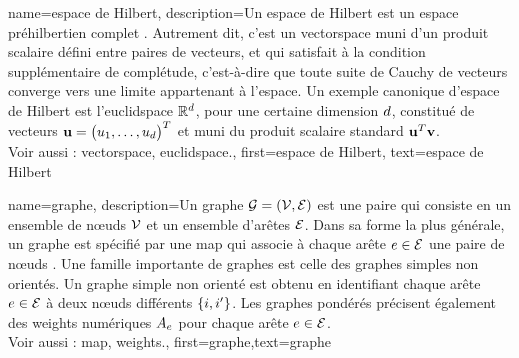 {name={espace de Hilbert},
	description={Un espace de Hilbert est un espace préhilbertien complet \cite{introhilbertbook}. 
		Autrement dit, c’est un \gls{vectorspace} muni d’un produit scalaire défini entre paires de vecteurs, 
		et qui satisfait à la condition supplémentaire de complétude, c’est-à-dire que toute suite de Cauchy de vecteurs 
		converge vers une limite appartenant à l’espace. Un exemple canonique d’espace de Hilbert est l’\gls{euclidspace} 
		$\mathbb{R}^{d}$, pour une certaine dimension $d$, constitué de vecteurs 
		${\bf u} = \big(u_1, \ldots, u_{d}\big)^T$ et muni du produit scalaire standard ${\bf u}^T {\bf v}$.
		\\
		Voir aussi : \gls{vectorspace}, \gls{euclidspace}.},
	first={espace de Hilbert},
	text={espace de Hilbert}
}

{name={graphe},
	description={Un graphe $\mathcal{G} = \left( \mathcal{V},\mathcal{E} \right)$ est une paire qui consiste en un ensemble de nœuds $\mathcal{V}$ et un ensemble d’arêtes $\mathcal{E}$. Dans sa forme la plus générale, un graphe est spécifié par une \gls{map} qui associe à chaque arête $e \in \mathcal{E}$ une paire de nœuds \cite{RockNetworks}. Une famille importante de graphes est celle des graphes simples non orientés. Un graphe simple non orienté est obtenu en identifiant chaque arête $e \in \mathcal{E}$ à deux nœuds différents $\{i,i'\}$. Les graphes pondérés précisent également des \gls{weights} numériques $A_{e}$ pour chaque arête $e \in \mathcal{E}$.
		\\
		Voir aussi : \gls{map}, \gls{weights}.},
	first={graphe},text={graphe}
}


